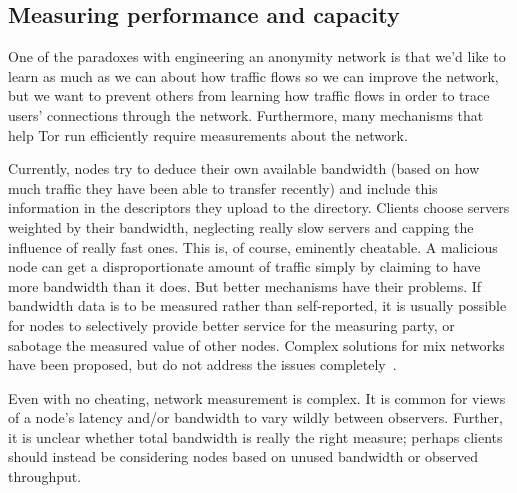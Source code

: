 \documentclass{llncs}
\begin{document}

\subsection{Measuring performance and capacity}
\label{subsec:performance}

One of the paradoxes with engineering an anonymity network is that we'd like
to learn as much as we can about how traffic flows so we can improve the
network, but we want to prevent others from learning how traffic flows in
order to trace users' connections through the network.  Furthermore, many
mechanisms that help Tor run efficiently
require measurements about the network.

Currently, nodes try to deduce their own available bandwidth (based on how
much traffic they have been able to transfer recently) and include this
information in the descriptors they upload to the directory. Clients
choose servers weighted by their bandwidth, neglecting really slow
servers and capping the influence of really fast ones.
%
This is, of course, eminently cheatable.  A malicious node can get a
disproportionate amount of traffic simply by claiming to have more bandwidth
than it does.  But better mechanisms have their problems.  If bandwidth data
is to be measured rather than self-reported, it is usually possible for
nodes to selectively provide better service for the measuring party, or
sabotage the measured value of other nodes.  Complex solutions for
mix networks have been proposed, but do not address the issues
completely~\cite{mix-acc,casc-rep}.

Even with no cheating, network measurement is complex.  It is common
for views of a node's latency and/or bandwidth to vary wildly between
observers.  Further, it is unclear whether total bandwidth is really
the right measure; perhaps clients should instead be considering nodes
based on unused bandwidth or observed throughput.

\end{document}
